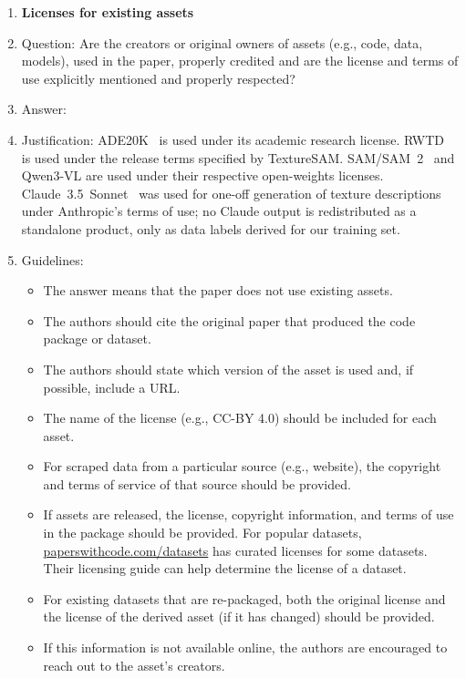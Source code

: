 \begin{enumerate}
\item {\bf Licenses for existing assets}
    \item[] Question: Are the creators or original owners of assets (e.g., code, data, models), used in the paper, properly credited and are the license and terms of use explicitly mentioned and properly respected?
    \item[] Answer: \answerYes{}
    \item[] Justification: ADE20K~\cite{ade20k} is used under its academic research license. RWTD~\cite{texturesam} is used under the release terms specified by TextureSAM. SAM/SAM~2~\cite{sam,sam2} and Qwen3-VL are used under their respective open-weights licenses. Claude~3.5~Sonnet~\cite{claude} was used for one-off generation of texture descriptions under Anthropic's terms of use; no Claude output is redistributed as a standalone product, only as data labels derived for our training set.
    \item[] Guidelines:
    \begin{itemize}
        \item The answer \answerNA{} means that the paper does not use existing assets.
        \item The authors should cite the original paper that produced the code package or dataset.
        \item The authors should state which version of the asset is used and, if possible, include a URL.
        \item The name of the license (e.g., CC-BY 4.0) should be included for each asset.
        \item For scraped data from a particular source (e.g., website), the copyright and terms of service of that source should be provided.
        \item If assets are released, the license, copyright information, and terms of use in the package should be provided. For popular datasets, \url{paperswithcode.com/datasets} has curated licenses for some datasets. Their licensing guide can help determine the license of a dataset.
        \item For existing datasets that are re-packaged, both the original license and the license of the derived asset (if it has changed) should be provided.
        \item If this information is not available online, the authors are encouraged to reach out to the asset's creators.
    \end{itemize}


\end{enumerate}
